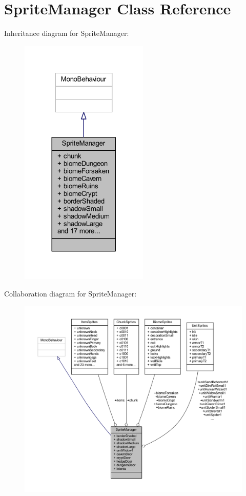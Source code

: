 \hypertarget{class_sprite_manager}{}\section{Sprite\+Manager Class Reference}
\label{class_sprite_manager}


Inheritance diagram for Sprite\+Manager\+:
\nopagebreak
\begin{figure}[H]
\begin{center}
\leavevmode
\includegraphics[width=173pt]{class_sprite_manager__inherit__graph}
\end{center}
\end{figure}


Collaboration diagram for Sprite\+Manager\+:
\nopagebreak
\begin{figure}[H]
\begin{center}
\leavevmode
\includegraphics[width=350pt]{class_sprite_manager__coll__graph}
\end{center}
\end{figure}
